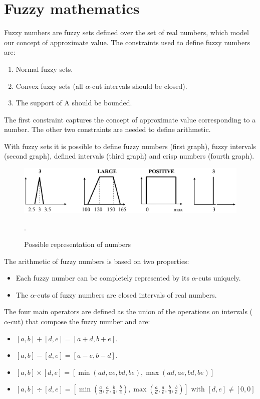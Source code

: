 \documentclass[12pt, a4paper]{report}
\begin{document}
    \section{Fuzzy mathematics}
    Fuzzy numbers are fuzzy sets defined over the set of real numbers, which model our concept of approximate value. The constraints used to 
    define fuzzy numbers are: 
    \begin{enumerate}
        \item Normal fuzzy sets.
        \item Convex fuzzy sets (all $\alpha$-cut intervals should be closed).
        \item The support of A should be bounded. 
    \end{enumerate}
    The first constraint captures the concept of approximate value corresponding to a number. The other two constraints are needed to define 
    arithmetic. 

    With fuzzy sets it is possible to define fuzzy numbers (first graph), fuzzy intervals (second graph), defined intervals (third graph) and 
    crisp numbers (fourth graph). 
    \begin{figure}[H]
        \centering
        \includegraphics[width=0.75\linewidth]{images/numbers.png}
        \caption{Possible representation of numbers}.
    \end{figure}

    The arithmetic of fuzzy numbers is based on two properties:
    \begin{itemize}
        \item Each fuzzy number can be completely represented by its $\alpha$-cuts uniquely. 
        \item The $\alpha$-cuts of fuzzy numbers are closed intervals of real numbers. 
    \end{itemize}

    The four main operators are defined as the union of the operations on intervals ($\alpha$-cut) that compose the fuzzy number and are: 
    \begin{itemize}
        \item $[a,b]+[d,e]=[a+d,b+e]$.
        \item $[a,b]-[d,e]=[a-e,b-d]$.
        \item $[a,b] \times [d,e]=[\min (ad,ae,bd,be),\max (ad,ae,bd,be)]$
        \item $[a,b] \div [d,e]=[\min (\frac{a}{d},\frac{a}{e},\frac{b}{d},\frac{b}{e}),\max (\frac{a}{d},\frac{a}{e},\frac{b}{d},\frac{b}{e})]$ with $[d,e] \neq [0,0]$
    \end{itemize}
\end{document}
